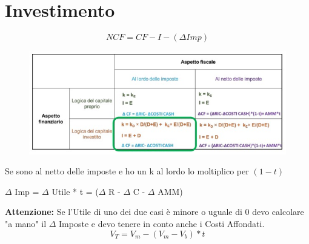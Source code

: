 \documentclass[a4paper]{report}
\begin{document}
\section*{Investimento}
\[
NCF=CF-I-(\Delta Imp )   
\]
\begin{figure}[h]
    \includegraphics[width=\textwidth]{SchemaInv.jpeg}
    \end{figure}
Se sono al netto delle imposte e ho un k al lordo lo moltiplico per $(1-t)$
\begin{center}
    $\Delta$ Imp =  $\Delta$ Utile * t = ($\Delta$ R - $\Delta$ C - $\Delta$ AMM)
\end{center}
\textbf{Attenzione:} Se l'Utile di uno dei due casi è minore o uguale di 0 devo calcolare "a mano" il $\Delta$ Imposte
e devo tenere in conto anche i Costi Affondati.
\[
V_T = V_m - (V_m-V_b)*t    
\]
\end{document}
